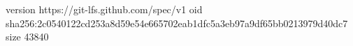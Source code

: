 version https://git-lfs.github.com/spec/v1
oid sha256:2c0540122cd253a8d59e54e665702eab1dfc5a3eb97a9df65bb0213979d40dc7
size 43840
